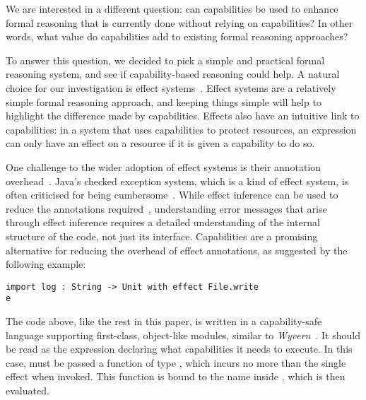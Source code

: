 We are interested in a different question: can capabilities be used to
enhance formal reasoning that is currently done without relying on
capabilities?  In other words, what value do capabilities add to
existing formal reasoning approaches?

To answer this question, we decided to pick a simple and practical
formal reasoning system, and see if capability-based reasoning could
help.  A natural choice for our investigation is effect
systems~\cite{nielson99}.  Effect systems are a relatively simple
formal reasoning approach, and keeping things simple will help to
highlight the difference made by capabilities.  Effects also have
an intuitive link to capabilities: in a system that uses capabilities
to protect resources, an expression can only have an effect on a
resource if it is given a capability to do so.

One challenge to the wider adoption of effect systems is their annotation
overhead~\cite{rytz12}. Java's checked exception system, which is a kind of effect
system, is often criticised for being cumbersome~\cite{Kiniry2006}. While effect inference can be used to reduce the annotations required~\cite{koka14},
understanding error messages that arise through effect inference requires a detailed understanding of the internal structure of the code, not just its interface. Capabilities are a promising
alternative for reducing the overhead of effect annotations, as
suggested by the following example:

\begin{lstlisting}
import log : String -> Unit with effect File.write
e
\end{lstlisting}

The code above, like the rest in this paper, is written in a capability-safe language supporting first-class, object-like modules, similar to \textit{Wyvern}~\cite{kurilova16}. It should be read as the expression  declaring what capabilities it needs to execute. In this case,  must be passed a function of type , which incurs no more than the single  effect when invoked. This function is bound to the name  inside , which is then evaluated.

